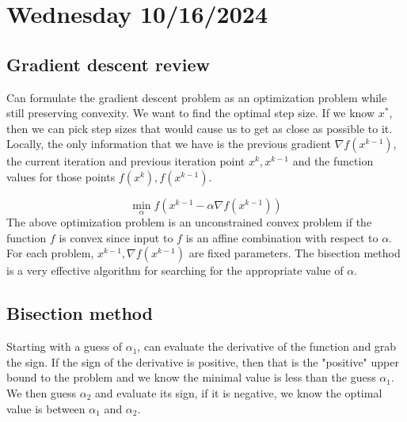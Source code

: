 \section{Wednesday 10/16/2024}
\subsection{Gradient descent review}
Can formulate the gradient descent problem as an optimization problem while still preserving convexity. We want to find the optimal step size. If we know $x^*$, then we can pick step sizes that would cause us to get as close as possible to it. Locally, the only information that we have is the previous gradient $\nabla f(x^{k-1})$, the current iteration and previous iteration point $x^k, x^{k-1}$ and the function values for those points $f(x^k),f(x^{k-1})$.

\begin{equation}
  \min_\alpha f(x^{k-1} - \alpha \nabla f(x^{k-1}))
\end{equation}
The above optimization problem is an unconstrained convex problem if the function $f$ is convex since input to $f$ is an affine combination with respect to $\alpha$. For each problem, $x^{k-1}, \nabla f(x^{k-1})$ are fixed parameters. The bisection method is a very effective algorithm for searching for the appropriate value of $\alpha$.

\subsection{Bisection method}
Starting with a guess of $\alpha_1$, can evaluate the derivative of the function and grab the sign. If the sign of the derivative is positive, then that is the "positive" upper bound to the problem and we know the minimal value is less than the guess $\alpha_1$. We then guess $\alpha_2$ and evaluate its sign, if it is negative, we know the optimal value is between $\alpha_1$ and $\alpha_2$.